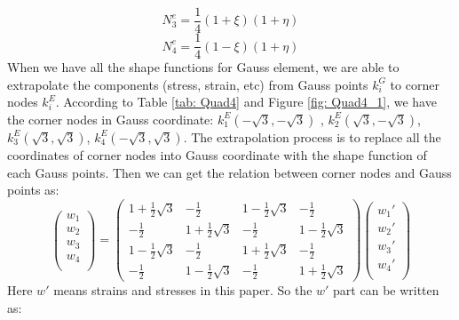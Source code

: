 \begin{equation}
N_3^e = \frac{1}{4} \left(1 + \xi\right) \left( 1 + \eta\right)
\end{equation}
\begin{equation}
N_4^e = \frac{1}{4} \left(1 - \xi\right) \left( 1 + \eta\right)
\end{equation}
When we have all the shape functions for Gauss element, we are able to extrapolate the components (stress, strain, etc) from Gauss points $k_i^G$ to corner nodes $k_i^E$. According to Table \ref{tab: Quad4} and  Figure \ref{fig: Quad4_1}, we have the corner nodes in Gauss coordinate: $k_1^E(-\sqrt{3}, -\sqrt{3})$ , $k_2^E(\sqrt{3}, -\sqrt{3})$, $k_3^E(\sqrt{3}, \sqrt{3})$, $k_4^E(-\sqrt{3}, \sqrt{3})$. The extrapolation process is to replace all the coordinates of corner nodes into Gauss coordinate with the shape function of each Gauss points. Then we can get the relation between corner nodes and Gauss points as:
\begin{equation}
\begin{pmatrix}
w_1 \\
w_2 \\
w_3 \\
w_4 \\
\end{pmatrix} = \begin{pmatrix}
1 + \frac{1}{2} \sqrt{3} & -\frac{1}{2} &  1 - \frac{1}{2} \sqrt{3} &  -\frac{1}{2}       \\[0.3em]
-\frac{1}{2} & 1 + \frac{1}{2} \sqrt{3} & -\frac{1}{2} &  1 - \frac{1}{2} \sqrt{3}            \\[0.3em]
1 - \frac{1}{2} \sqrt{3} & -\frac{1}{2}  & 1 + \frac{1}{2} \sqrt{3} &  -\frac{1}{2}         \\[0.3em]
-\frac{1}{2} &  1 - \frac{1}{2} \sqrt{3} & -\frac{1}{2} &   1 + \frac{1}{2} \sqrt{3}                             
\end{pmatrix} \begin{pmatrix}
{w_1}' \\
{w_2}' \\
{w_3}' \\
{w_4}' \\
\end{pmatrix}
\end{equation}	
Here $w'$ means strains and stresses in this paper. So the $w'$ part can be written as:
